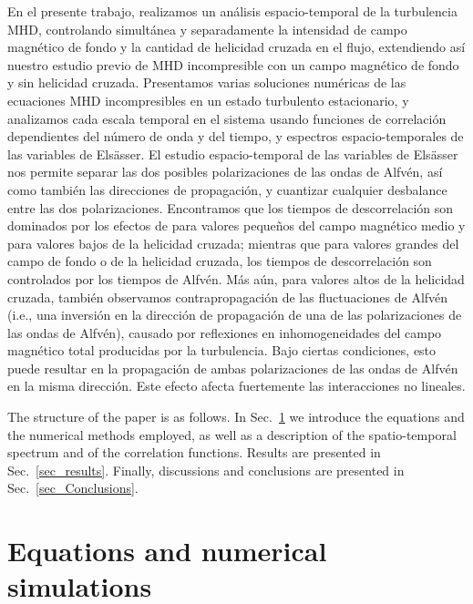 En el presente trabajo, realizamos un análisis espacio-temporal de la
turbulencia MHD, controlando simultánea y separadamente la intensidad
de campo magnético de fondo y la cantidad de helicidad cruzada en el
flujo, extendiendo así nuestro estudio previo
\cite{lugones_2016_spatiotemporal} de MHD incompresible con un campo
magnético de fondo y sin helicidad cruzada.  Presentamos varias
soluciones numéricas de las ecuaciones MHD incompresibles en un estado
turbulento estacionario, y analizamos cada escala temporal en el
sistema usando funciones de correlación dependientes del número de
onda y del tiempo, y espectros espacio-temporales de las variables de
Els\"asser.  El estudio espacio-temporal de las variables de
Els\"asser nos permite separar las dos posibles polarizaciones de las
ondas de Alfvén, así como también las direcciones de propagación, y
cuantizar cualquier desbalance entre las dos polarizaciones.
Encontramos que los tiempos de descorrelación son dominados por los
efectos de \sweeping para valores pequeños del campo magnético medio y
para valores bajos de la helicidad cruzada; mientras que para valores
grandes del campo de fondo o de la helicidad cruzada, los tiempos de
descorrelación son controlados por los tiempos de Alfvén.  Más aún,
para valores altos de la helicidad cruzada, también observamos
contrapropagación de las fluctuaciones de Alfvén (i.e., una inversión
en la dirección de propagación de una de las polarizaciones de las
ondas de Alfvén), causado por reflexiones en inhomogeneidades del
campo magnético total producidas por la turbulencia. Bajo ciertas
condiciones, esto puede resultar en la propagación de ambas
polarizaciones de las ondas de Alfvén en la misma dirección. Este
efecto afecta fuertemente las interacciones no lineales.

The structure of the paper is as follows. In Sec.~\ref{sec_EqNumSim}
we introduce the equations and the numerical methods employed, as well
as a description of the spatio-temporal spectrum and of the
correlation functions. Results are presented in
Sec.~\ref{sec_results}. Finally, discussions and conclusions are
presented in Sec.~\ref{sec_Conclusions}.

\section{Equations and numerical simulations}\label{sec_EqNumSim}


